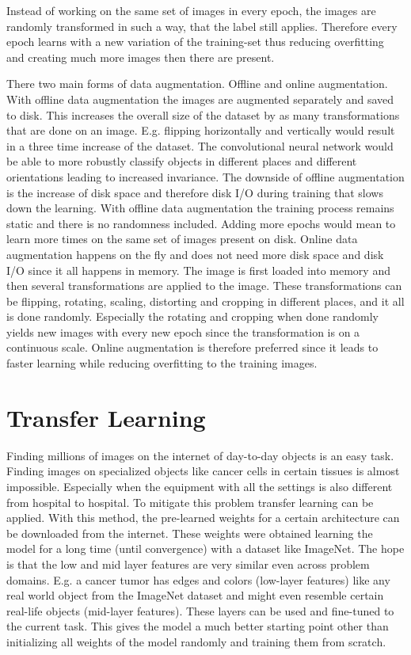 Instead of working on the same set of images in every epoch, the images are randomly transformed in such a way, that the label still applies. Therefore every epoch learns with a new variation of the training-set thus reducing overfitting and creating much more images then there are present.

There two main forms of data augmentation. Offline and online augmentation. With offline data augmentation the images are augmented separately and saved to disk. This increases the overall size of the dataset by as many transformations that are done on an image. E.g. flipping horizontally and vertically would result in a three time increase of the dataset. The convolutional neural network would be able to more robustly classify objects in different places and different orientations leading to increased invariance. The downside of offline augmentation is the increase of disk space and therefore disk I/O during training that slows down the learning. With offline data augmentation the training process remains static and there is no randomness included. Adding more epochs would mean to learn more times on the same set of images present on disk.
Online data augmentation happens on the fly and does not need more disk space and disk I/O since it all happens in memory. The image is first loaded into memory and then several transformations are applied to the image. These transformations can be flipping, rotating, scaling, distorting and cropping in different places, and it all is done randomly. Especially the rotating and cropping when done randomly yields new images with every new epoch since the transformation is on a continuous scale. Online augmentation is therefore preferred since it leads to faster learning while reducing overfitting to the training images.

\section{Transfer Learning}

Finding millions of images on the internet of day-to-day objects is an easy task. Finding images on specialized objects like cancer cells in certain tissues is almost impossible. Especially when the equipment with all the settings is also different from hospital to hospital. To mitigate this problem transfer learning can be applied. With this method, the pre-learned weights for a certain architecture can be downloaded from the internet. These weights were obtained learning the model for a long time (until convergence) with a dataset like ImageNet. The hope is that the low and mid layer features are very similar even across problem domains. E.g. a cancer tumor has edges and colors (low-layer features) like any real world object from the ImageNet dataset and might even resemble certain real-life objects (mid-layer features). These layers can be used and fine-tuned to the current task. This gives the model a much better starting point other than initializing all weights of the model randomly and training them from scratch. 

